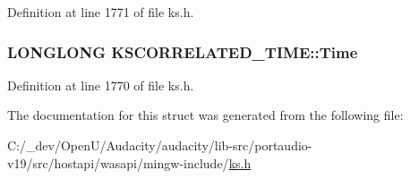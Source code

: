 Definition at line 1771 of file ks.\+h.

\subsubsection[{\texorpdfstring{Time}{Time}}]{\setlength{\rightskip}{0pt plus 5cm}L\+O\+N\+G\+L\+O\+NG K\+S\+C\+O\+R\+R\+E\+L\+A\+T\+E\+D\+\_\+\+T\+I\+M\+E\+::\+Time}\hypertarget{struct_k_s_c_o_r_r_e_l_a_t_e_d___t_i_m_e_aebe57472bf750d037da9d79101ae40de}{}\label{struct_k_s_c_o_r_r_e_l_a_t_e_d___t_i_m_e_aebe57472bf750d037da9d79101ae40de}


Definition at line 1770 of file ks.\+h.



The documentation for this struct was generated from the following file\+:\begin{DoxyCompactItemize}
\item 
C\+:/\+\_\+dev/\+Open\+U/\+Audacity/audacity/lib-\/src/portaudio-\/v19/src/hostapi/wasapi/mingw-\/include/\hyperlink{ks_8h}{ks.\+h}\end{DoxyCompactItemize}
